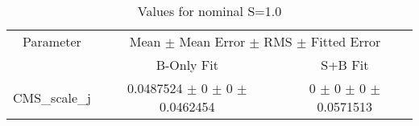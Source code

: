 \begin{table}
\centering
\caption{Values for nominal S=1.0}
\begin{tabular}{ccc}
\toprule
Parameter & \multicolumn{2}{c}{Mean $\pm$ Mean Error $\pm$ RMS $\pm$ Fitted Error}\\
 & B-Only Fit & S+B Fit\\
\midrule
CMS\_scale\_j & \num{0.0487524} $\pm$ \num{0} $\pm$ \num{0} $\pm$ \num{0.0462454} & \num{0} $\pm$ \num{0} $\pm$ \num{0} $\pm$ \num{0.0571513}\\
\bottomrule
\end{tabular}
\end{table}
